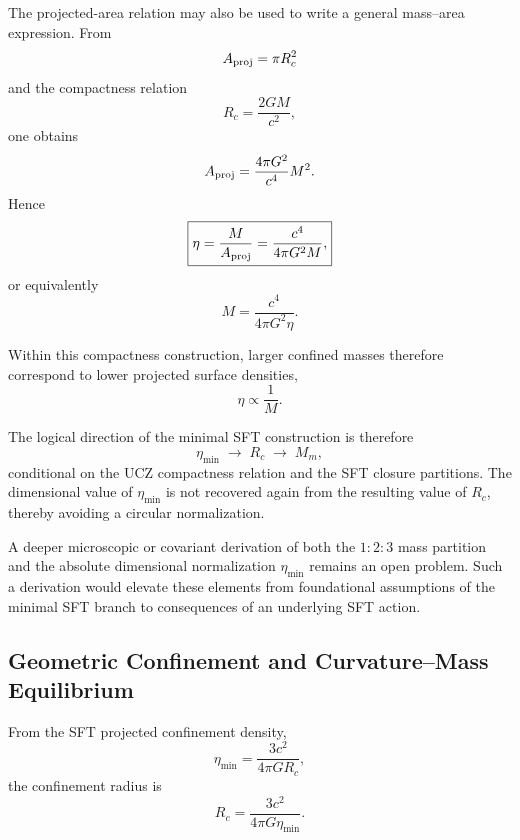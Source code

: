 \documentclass[12pt]{article}
\begin{document}
The projected-area relation may also be used to write a general
mass--area expression. From
\begin{equation}
A_{\rm proj}
=
\pi R_c^2
\end{equation}
and the compactness relation
\begin{equation}
R_c=\frac{2GM}{c^2},
\end{equation}
one obtains
\begin{equation}
A_{\rm proj}
=
\frac{4\pi G^2}{c^4}M^2.
\end{equation}
Hence
\begin{equation}
\boxed{
\eta
=
\frac{M}{A_{\rm proj}}
=
\frac{c^4}{4\pi G^2M},
}
\label{eq:eta_general}
\end{equation}
or equivalently
\begin{equation}
\boxed{
M
=
\frac{c^4}{4\pi G^2\eta}.
}
\end{equation}

Within this compactness construction, larger confined masses therefore
correspond to lower projected surface densities,
\begin{equation}
\eta\propto\frac{1}{M}.
\end{equation}

The logical direction of the minimal SFT construction is therefore
\begin{equation}
\boxed{
\eta_{\min}
\;\longrightarrow\;
R_c
\;\longrightarrow\;
M_m,
}
\end{equation}
conditional on the UCZ compactness relation and the SFT closure
partitions. The dimensional value of $\eta_{\min}$ is not recovered
again from the resulting value of $R_c$, thereby avoiding a circular
normalization.

A deeper microscopic or covariant derivation of both the
$1{:}2{:}3$ mass partition and the absolute dimensional normalization
$\eta_{\min}$ remains an open problem. Such a derivation would elevate
these elements from foundational assumptions of the minimal SFT branch
to consequences of an underlying SFT action.

\subsection{Geometric Confinement and Curvature--Mass Equilibrium}

From the SFT projected confinement density,
\[
\eta_{\min}
=
\frac{3c^2}{4\pi G R_c},
\]
the confinement radius is
\begin{equation}
\boxed{
R_c
=
\frac{3c^2}{4\pi G\eta_{\min}}.
}
\label{eq:Rc_eta_relation}
\end{equation}
\end{document}
